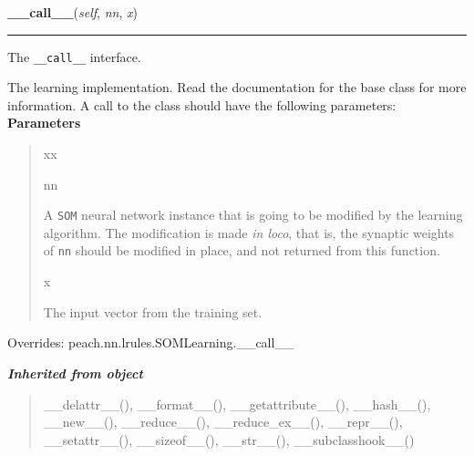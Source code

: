 \hspace{.8\funcindent}\begin{boxedminipage}{\funcwidth}

    \raggedright \textbf{\_\_call\_\_}(\textit{self}, \textit{nn}, \textit{x})

    \vspace{-1.5ex}

    \rule{\textwidth}{0.5\fboxrule}
\setlength{\parskip}{2ex}

The \texttt{\_\_call\_\_} interface.

The learning implementation. Read the documentation for the base class
for more information. A call to the class should have the following
parameters:
\setlength{\parskip}{1ex}
      \textbf{Parameters}
      \vspace{-1ex}

      \begin{quote}
        \begin{Ventry}{xx}

          \item[nn]


A \texttt{SOM} neural network instance that is going to be modified by
the learning algorithm. The modification is made \emph{in loco}, that is,
the synaptic weights of \texttt{nn} should be modified in place, and not
returned from this function.
          \item[x]


The input vector from the training set.
        \end{Ventry}

      \end{quote}

      Overrides: peach.nn.lrules.SOMLearning.\_\_call\_\_

    \end{boxedminipage}


\large{\textbf{\textit{Inherited from object}}}

\begin{quote}
\_\_delattr\_\_(), \_\_format\_\_(), \_\_getattribute\_\_(), \_\_hash\_\_(), \_\_new\_\_(), \_\_reduce\_\_(), \_\_reduce\_ex\_\_(), \_\_repr\_\_(), \_\_setattr\_\_(), \_\_sizeof\_\_(), \_\_str\_\_(), \_\_subclasshook\_\_()
\end{quote}



